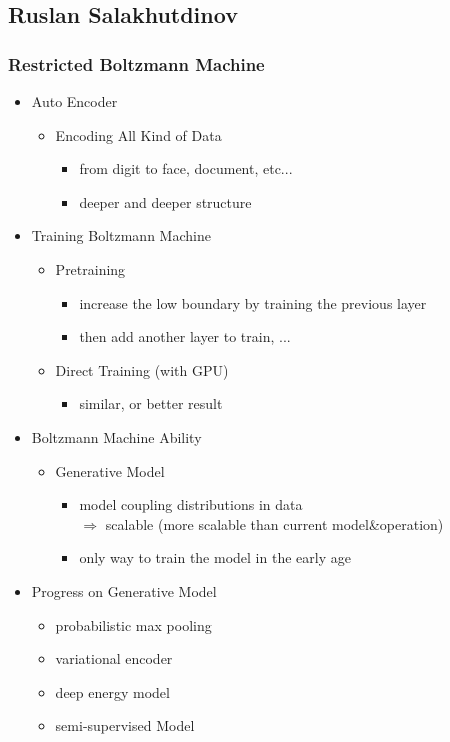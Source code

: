 \subsection{Ruslan Salakhutdinov}
\subsubsection{Restricted Boltzmann Machine}
\begin{itemize}
\item Auto Encoder
	\begin{itemize}
	\item Encoding All Kind of Data
		\begin{itemize}
		\item from digit to face, document, etc...
		\item deeper and deeper structure
		\end{itemize}
	\end{itemize}
\item Training Boltzmann Machine
	\begin{itemize}
	\item Pretraining
		\begin{itemize}
		\item increase the low boundary by training the previous layer
		\item then add another layer to train, ...
		\end{itemize}
	\item Direct Training (with GPU)
		\begin{itemize}
		\item similar, or better result
		\end{itemize}
	\end{itemize}
\item Boltzmann Machine Ability
	\begin{itemize}
	\item Generative Model
		\begin{itemize}
		\item model coupling distributions in data \\
		$\Rightarrow$ scalable (more scalable than current model\&operation)
		\item only way to train the model in the early age
		\end{itemize}
	\end{itemize}
\item Progress on Generative Model
	\begin{itemize}
	\item probabilistic max pooling
	\item variational encoder
	\item deep energy model
	\item semi-supervised Model
	\end{itemize}
\end{itemize}

